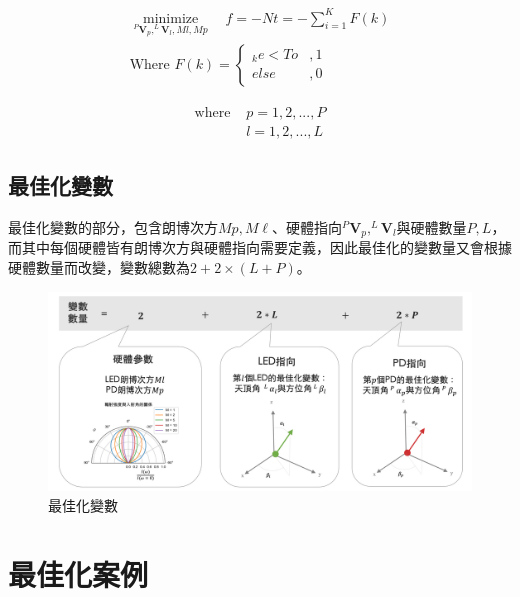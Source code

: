     \begin{equation}
        \label{eqn:objective}
        \begin{aligned}
        \underset{^{P}\boldsymbol{V}_p, ^{L}\boldsymbol{V}_l,Ml,Mp}{\operatorname{minimize}} 
        \quad f = {-Nt}=
        {-\sum_{i=1}^{K}F(k)} \\
        \text{Where }F(k)=
        \begin{cases}
            _{k}e<To&,1\\
            else&,0
        \end{cases}
        \end{aligned}
    \end{equation}

    \begin{align*} \text{where }
        &p=1,2,...,P\\&l=1,2,...,L
    \end{align*}


    \subsection{最佳化變數}
    \label{chp:optimize_variable}

    最佳化變數的部分，包含朗博次方$Mp,M\ell$、硬體指向$^{P}\boldsymbol{V}_p,^{L}\boldsymbol{V}_l$與硬體數量$P,L$，而其中每個硬體皆有朗博次方與硬體指向需要定義，因此最佳化的變數量又會根據硬體數量而改變，變數總數為$2+2\times(L+P)$。


    \begin{figure}[htpb]
        \centering
        \includegraphics[width=15cm]{ch5pic/optimize_variable.png}
        \caption{最佳化變數}
        \label{pic:optimize_variable}
    \end{figure}



\section{最佳化案例}
\label{chp:optimize_case}

